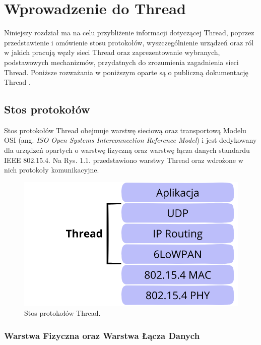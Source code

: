 \chapter{Wprowadzenie do Thread}
\label{cha:wprowadzenie}

Niniejszy rozdział ma na celu przybliżenie informacji dotyczącej Thread, poprzez przedstawienie i omówienie stosu protokołów, wyszczególnienie urządzeń oraz ról w jakich pracują węzły sieci Thread oraz zaprezentowanie wybranych, podstawowych mechanizmów, przydatnych do zrozumienia zagadnienia sieci Thread. Poniższe rozważania w poniższym oparte są o publiczną dokumentację Thread \cite{thread-1.3.0}.

\section{Stos protokołów}

    Stos protokołów Thread obejmuje warstwę sieciową oraz transportową Modelu OSI (ang. \textit{ISO Open Systems Interconnection Reference Model}) i jest dedykowany dla urządzeń opartych o warstwę fizyczną oraz warstwę łącza danych standardu IEEE 802.15.4. Na Rys. 1.1. przedstawiono warstwy Thread oraz wdrożone w nich protokoły komunikacyjne.

    \begin{figure}[H]
        \centering
        \includegraphics[width=0.8\linewidth]{graphics/thread-protocol-stack.png}
        \caption{Stos protokołów Thread.}
        \label{fig:thread-sprotocol-stack}
    \end{figure}

    \subsection{Warstwa Fizyczna oraz Warstwa Łącza Danych}

